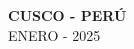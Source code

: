 





\vspace{5cm}						

\begin{center}
\Large \textbf{CUSCO - PERÚ} \\  ENERO - 2025
\end{center}

\clearpage